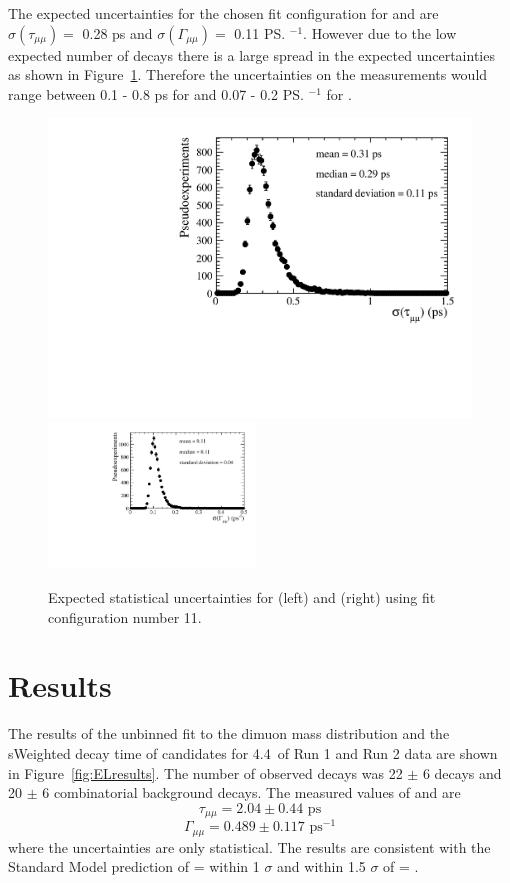 The expected uncertainties for the chosen fit configuration for \tmumu and \Gmumu are $\sigma \left ( \tau_{\mu\mu}  \right ) = $ 0.28 ps and  $\sigma \left ( \Gamma_{\mu\mu}  \right ) = $ 0.11 \ps$^{-1}$. However due to the low expected number of decays there is a large spread in the expected uncertainties as shown in Figure~\ref{fig:exptuncert}. Therefore the uncertainties on the measurements would range between 0.1 - 0.8 ps for \tmumu and 0.07 - 0.2 \ps$^{-1}$ for \Gmumu.


\begin{figure}[htbp]
    \centering
        \includegraphics[width=0.49 \textwidth]{./Figs/LifetimeMeasurement/5320-6000_tau_err.pdf}
        \includegraphics[width=0.49\textwidth]{./Figs/LifetimeMeasurement/5320-6000_gamma_err.pdf}

    \caption{Expected statistical uncertainties for \tmumu (left) and \Gmumu (right) using fit configuration number 11.}
    \label{fig:exptuncert}
\end{figure}


\section{Results}
\label{sec:ELresults}

The results of the unbinned \ml fit to the dimuon mass distribution and the sWeighted decay time of \bsmumu candidates for 4.4~\fb of Run 1 and Run 2 data are shown in Figure~\ref{fig:ELresults}. The number of observed decays was 22 $\pm$ 6 \bsmumu decays and 20 $\pm$ 6 combinatorial background decays. The measured values of \tmumu and \Gmumu are
\begin{equation}
\tau_{\mu\mu} = 2.04 \pm 0.44  \text{ ps} 
\end{equation}
\begin{equation}
\Gamma_{\mu\mu} = 0.489  \pm 0.117 \text{ ps}^{-1}
\end{equation}
where the uncertainties are only statistical. The results are consistent with the Standard Model prediction of \tmumu = \tH within  1 $\sigma$ and within  1.5 $\sigma$ of \tmumu = \tL.


